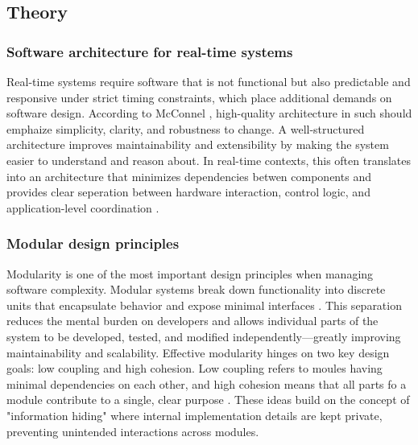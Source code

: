 
\subsection{Theory}
\subsubsection{Software architecture for real-time systems}
Real-time systems require software that is not functional but also predictable and responsive under strict timing constraints, which place additional demands on software design. According to McConnel \cite{steve_mcconnell_code_nodate}, high-quality architecture in such should emphaize simplicity, clarity, and robustness to change. 
\newline \newline
A well-structured architecture improves maintainability and extensibility by making the system easier to understand and reason about. In real-time contexts, this often translates into an architecture that minimizes dependencies betwen components and provides clear seperation between hardware interaction, control logic, and application-level coordination \cite{tanenbaum_distributed_2007}.

\subsubsection{Modular design principles}
Modularity is one of the most important design principles when managing software complexity. Modular systems break down functionality into discrete units that encapsulate behavior and expose minimal interfaces \cite{steve_mcconnell_code_nodate}. This separation reduces the mental burden on developers and allows individual parts of the system to be developed, tested, and modified independently—greatly improving maintainability and scalability.
\newline \newline
Effective modularity hinges on two key design goals: low coupling and high cohesion. Low coupling refers to moules having minimal dependencies on each other, and high cohesion means that all parts fo a module contribute to a single, clear purpose \cite{steve_mcconnell_code_nodate}. These ideas build on the concept of "information hiding" \cite{parnas_criteria_1972} where internal implementation details are kept private, preventing unintended interactions across modules.

